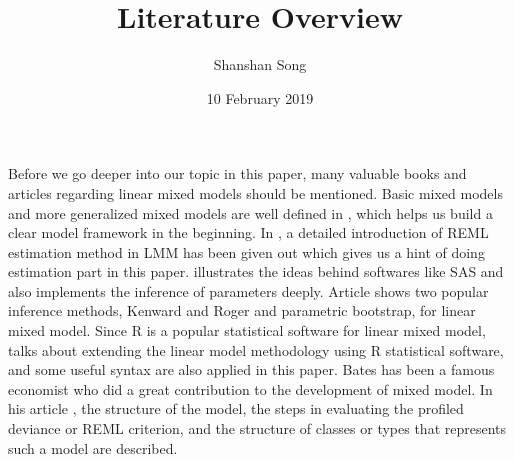 \documentclass[12pt]{article}
\title{Literature Overview}
\author{Shanshan Song}
\date{10 February 2019}
\begin{document}

\nocite{*}
Before we go deeper into our topic in this paper, many valuable books and articles regarding linear mixed models should be mentioned. Basic mixed models and more generalized mixed models are well defined in \cite{Fahrmeir}, which helps us build a clear model framework in the beginning. In \cite{Tutorial}, a detailed introduction of REML estimation method in LMM has been given out which gives us a hint of doing estimation part in this paper. \cite{Verbeke} illustrates the ideas behind softwares like SAS and also implements the inference of parameters deeply. Article \cite{KR} shows two popular inference methods, Kenward and Roger and parametric bootstrap, for linear mixed model. Since R is a popular statistical software for linear mixed model, \cite{Faraway} talks about extending the linear model methodology using R statistical software, and some useful syntax are also applied in this paper. Bates has been a famous economist who did a great contribution to the development of mixed model. In his article \cite{Bates}, the structure of the model, the steps in evaluating the profiled deviance or REML criterion, and the structure of classes or types that represents such a model are described.


\end{document}
